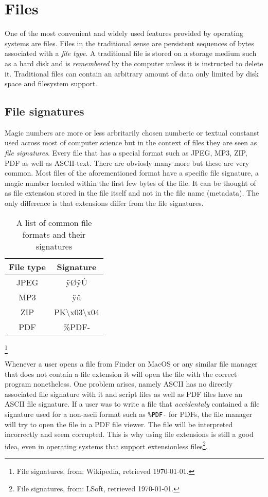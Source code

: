 \section{Files}

One of the most convenient and widely used features provided by operating systems are files. Files in
the traditional sense are persistent sequences of bytes associated with a \textit{file type}. A traditional
file is stored on a storage medium such as a hard disk and is \textit{remembered} by the computer unless it is
instructed to delete it. Traditional files can contain an arbitrary amount of data only limited by disk
space and filesystem support.

\subsection{File signatures}

Magic numbers are more or less arbritarily chosen
numberic or textual constanst used across most of computer science but in the context of files
they are seen as \textit{file signatures}. Every file that has a special format such as JPEG, MP3, ZIP,
PDF as well as ASCII-text. There are obviosly many more but these are very common. Most files
of the aforementioned format have a specific file signature, a magic number located within the first
few bytes of the file. It can be thought of as file extension stored in the file itself and not in
the file name (metadata). The only difference is that extensions differ from the file signatures.


\begin{table}
\centering
	\begin{tabular}[H]{| c | c |}
File type & Signature \\
\hline
 JPEG & ÿØÿÛ \\ 
 MP3 & ÿû \\
 ZIP & PK\textbackslash{}x03\textbackslash{}x04 \\ 
 PDF & \%PDF-
\end{tabular}
	\caption{A list of common file formats and their signatures}\footnote{ File signatures, from: Wikipedia, retrieved \today.}
\end{table}

\raggedright
\bigskip

Whenever a user opens a file from Finder on MacOS or any similar file manager that does not contain a
file extension it will open the file with the correct program nonetheless. One problem arises, namely
ASCII has no directly associated file signature with it and script files as well as PDF files have an
ASCII file signature. If a user was to write a file that \textit{accidentaly} contained a file signature used
for a non-ascii format such as \texttt{\%PDF-} for PDFs, the file manager will try to open the file in a PDF
file viewer. The file will be interpreted incorrectly and seem corrupted. This is why using file
extensions is still a good idea, even in operating systems that support extensionless files\footnote{File signatures, from: LSoft, retrieved \today.}.

